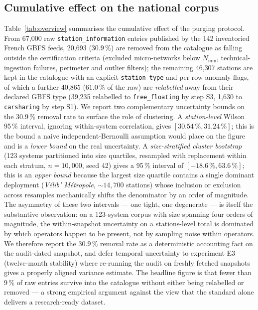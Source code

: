 \documentclass[11pt,a4paper]{article}
\begin{document}
\subsection{Cumulative effect on the national corpus}
Table~\ref{tab:overview} summarises the cumulative effect of the
purging protocol. From 67{,}000 raw \texttt{station\_information}
entries published by the 142 inventoried French GBFS feeds,
20{,}693 ($30.9\,\%$) are removed from the catalogue as falling
outside the certification criteria (excluded micro-networks below
$N_{\min}$, technical-ingestion failures, perimeter and outlier
filters); the remaining 46{,}307 stations are kept in the catalogue
with an explicit \texttt{station\_type} and per-row anomaly flags,
of which a further 40{,}865 ($61.0\,\%$ of the raw) are
\emph{relabelled} away from their declared GBFS type (39{,}235
relabelled to \texttt{free\_floating} by step S3, 1{,}630 to
\texttt{carsharing} by step S1). We report two complementary uncertainty bounds on the
$30.9\,\%$ removal rate to surface the role of clustering. A
\emph{station-level} Wilson 95\,\% interval, ignoring within-system
correlation, gives $[30.54\,\%, 31.24\,\%]$; this is the bound a
naive independent-Bernoulli assumption would place on the figure
and is a \emph{lower bound} on the real uncertainty. A
\emph{size-stratified cluster bootstrap} (123 systems partitioned
into size quartiles, resampled with replacement within each
stratum, $n = 10{,}000$, seed 42) gives a 95\,\% interval of
$[-18.6\,\%, 63.6\,\%]$; this is an \emph{upper bound} because
the largest size quartile contains a single dominant deployment
(\emph{V\'elib' M\'etropole}, $\sim 14{,}700$ stations) whose
inclusion or exclusion across resamples mechanically shifts the
denominator by an order of magnitude. The asymmetry of these two
intervals --- one tight, one degenerate --- is itself the
substantive observation: on a 123-system corpus with size
spanning four orders of magnitude, the within-snapshot
uncertainty on a stations-level total is dominated by which
operators happen to be present, not by sampling noise within
operators. We therefore report the $30.9\,\%$ removal rate as a
deterministic accounting fact on the audit-dated snapshot, and
defer temporal uncertainty to experiment E3 (twelve-month
stability) where re-running the audit on freshly fetched
snapshots gives a properly aligned variance estimate. The
headline figure is that fewer than $9\,\%$ of raw entries
survive into the catalogue without either being relabelled or
removed --- a strong empirical argument against the view that the
standard alone delivers a research-ready dataset.
\end{document}
